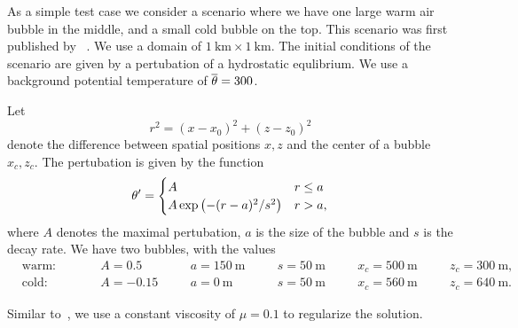 As a simple test case we consider a scenario where we have one large warm air bubble in the middle, and a small cold bubble on the top.
This scenario was first published by \citeauthor{robert1993bubble}~\cite{robert1993bubble}.
We use a domain of $\SI{1}{\km} \times \SI{1}{\km}$.
The initial conditions of the scenario are given by a pertubation of a hydrostatic equlibrium.
We use a background potential temperature of $\overline{\theta} = 300$.

Let
\begin{equation}
  \label{eq:radius}
  r^2 = (x - x_0)^2 + (z - z_0)^2
\end{equation}
denote the difference between spatial positions $x,z$ and the center of a bubble $x_c, z_c$.
The pertubation is given by the function
\begin{equation}
  \label{eq:bubbles-pertubation}
  \theta' =
  \begin{cases}
    A & r \leq a \\
    A \exp \left( - (r-a)^2/s^2 \right) & r > a,
    \end{cases}
\end{equation}
where $A$ denotes the maximal pertubation, $a$ is the size of the bubble and $s$ is the decay rate.
We have two bubbles, with the values
\begin{equation}
  \label{eq:bubbles-values}
\begin{alignedat}{6}
  & \text{warm:} \qquad && A = 0.5 \quad&& a = \SI{150}{\m} \quad&& s = \SI{50}{\m} \quad&& x_c = \SI{500}{\m} \quad&& z_c = \SI{300}{\m},\\
  & \text{cold:} \qquad && A = -0.15 \quad&& a = \SI{0}{\m} \quad&& s = \SI{50}{\m} \quad&& x_c = \SI{560}{\m} \quad&& z_c = \SI{640}{\m}.
  \end{alignedat}
\end{equation}

Similar to~\cite{muller2010adaptive}, we use a constant viscosity of $\mu = 0.1$ to regularize the solution.


